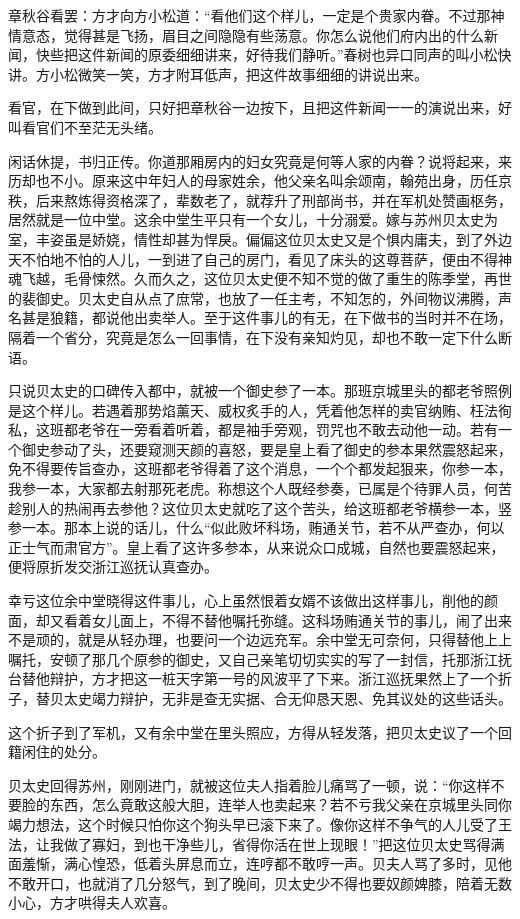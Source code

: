 \documentclass[12pt,UTF8]{ctexbook}
\begin{document}
{{{章秋谷看罢：方才向方小松道：“看他们这个样儿，一定是个贵家内眷。不过那神情意态，觉得甚是飞扬，眉目之间隐隐有些荡意。你怎么说他们府内出的什么新闻，快些把这件新闻的原委细细讲来，好待我们静听。”春树也异口同声的叫小松快讲。方小松微笑一笑，方才附耳低声，把这件故事细细的讲说出来。

看官，在下做到此间，只好把章秋谷一边按下，且把这件新闻一一的演说出来，好叫看官们不至茫无头绪。

闲话休提，书归正传。你道那厢房内的妇女究竟是何等人家的内眷？说将起来，来历却也不小。原来这中年妇人的母家姓余，他父亲名叫余颂南，翰苑出身，历任京秩，后来熬炼得资格深了，辈数老了，就荐升了刑部尚书，并在军机处赞画枢务，居然就是一位中堂。这余中堂生平只有一个女儿，十分溺爱。嫁与苏州贝太史为室，丰姿虽是娇娆，情性却甚为悍戾。偏偏这位贝太史又是个惧内庸夫，到了外边天不怕地不怕的人儿，一到进了自己的房门，看见了床头的这尊菩萨，便由不得神魂飞越，毛骨悚然。久而久之，这位贝太史便不知不觉的做了重生的陈季堂，再世的裴御史。贝太史自从点了庶常，也放了一任主考，不知怎的，外间物议沸腾，声名甚是狼籍，都说他出卖举人。至于这件事儿的有无，在下做书的当时并不在场，隔着一个省分，究竟是怎么一回事情，在下没有亲知灼见，却也不敢一定下什么断语。

只说贝太史的口碑传入都中，就被一个御史参了一本。那班京城里头的都老爷照例是这个样儿。若遇着那势焰薰天、威权炙手的人，凭着他怎样的卖官纳贿、枉法徇私，这班都老爷在一旁看着听着，都是袖手旁观，罚咒也不敢去动他一动。若有一个御史参动了头，还要窥测天颜的喜怒，要是皇上看了御史的参本果然震怒起来，免不得要传旨查办，这班都老爷得着了这个消息，一个个都发起狠来，你参一本，我参一本，大家都去射那死老虎。称想这个人既经参奏，已属是个待罪人员，何苦趁别人的热闹再去参他？这位贝太史就吃了这个苦头，给这班都老爷横参一本，竖参一本。那本上说的话儿，什么“似此败坏科场，贿通关节，若不从严查办，何以正士气而肃官方”。皇上看了这许多参本，从来说众口成城，自然也要震怒起来，便将原折发交浙江巡抚认真查办。

幸亏这位余中堂晓得这件事儿，心上虽然恨着女婿不该做出这样事儿，削他的颜面，却又看着女儿面上，不得不替他嘱托弥缝。这科场贿通关节的事儿，闹了出来不是顽的，就是从轻办理，也要问一个边远充军。余中堂无可奈何，只得替他上上嘱托，安顿了那几个原参的御史，又自己亲笔切切实实的写了一封信，托那浙江抚台替他辩护，方才把这一桩天字第一号的风波平了下来。浙江巡抚果然上了一个折子，替贝太史竭力辩护，无非是查无实据、合无仰恳天恩、免其议处的这些话头。

这个折子到了军机，又有余中堂在里头照应，方得从轻发落，把贝太史议了一个回籍闲住的处分。

贝太史回得苏州，刚刚进门，就被这位夫人指着脸儿痛骂了一顿，说：“你这样不要脸的东西，怎么竟敢这般大胆，连举人也卖起来？若不亏我父亲在京城里头同你竭力想法，这个时候只怕你这个狗头早已滚下来了。像你这样不争气的人儿受了王法，让我做了寡妇，到也干净些儿，省得你活在世上现眼！”把这位贝太史骂得满面羞惭，满心惶恐，低着头屏息而立，连哼都不敢哼一声。贝夫人骂了多时，见他不敢开口，也就消了几分怒气，到了晚间，贝太史少不得也要奴颜婢膝，陪着无数小心，方才哄得夫人欢喜。

}}}
\end{document}
